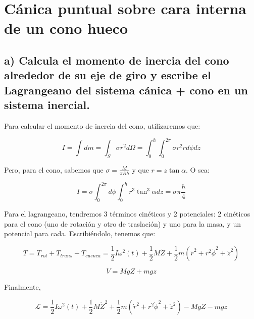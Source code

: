 \documentclass[a4paper,12pt]{article}
\begin{document}
\section{ Cánica puntual sobre cara interna de un cono hueco}

\subsection*{a) Calcula el momento de inercia del cono alrededor de su eje de giro y escribe el Lagrangeano del sistema cánica + cono en un sistema inercial.}

Para calcular el momento de inercia del cono, utilizaremos que:

$$I = \int dm = \int_S \sigma r^{2} d\Omega = \int_0^h \int_0^{2\pi} \sigma r^2 r d\phi dz$$

Pero, para el cono, sabemos que $\sigma = \frac{M}{\pi R h}$ y que $r = z \tan\alpha $. O sea:

$$I= \sigma\int_0^{2\pi}d\phi \int_0^h  r^3 \tan^3\alpha dz = \sigma \pi \frac{h}{4}  $$

Para el lagrangeano, tendremos 3 términos cinéticos y 2 potenciales: 2 cinéticos para el cono (uno de rotación y otro de traslación) y uno para la masa, y un potencial para cada. Escribiéndolo, tenemos que:

$$T = T_{rot} + T_{trans} + T_{cuenca} = \frac{1}{2} I \omega^2(t) + \frac{1}{2} M \dot{Z} + \frac{1}{2} m  (\dot{r}^2 + r^2 \dot{\phi}^2+\dot{z}^2)$$

$$V = M g Z + mgz$$

Finalmente, 

\begin{equation}
  \mathcal{L} = \frac{1}{2} I \omega^2(t) + \frac{1}{2} M \dot{Z}^2 + \frac{1}{2} m  (\dot{r}^2 + r^2 \dot{\phi}^2+\dot{z}^2) - M g Z - mgz
\end{equation}
\end{document}
